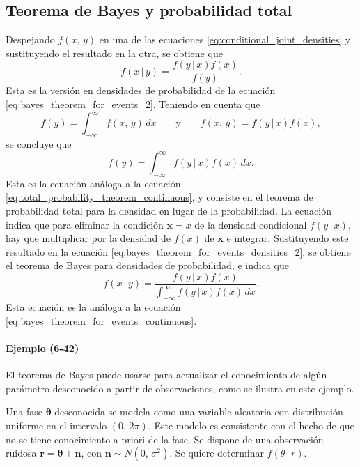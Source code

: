 \documentclass[a4paper]{report}
\newcommand{\x}{\mathbf{x}}
\begin{document}
\subsection{Teorema de Bayes y probabilidad total}

Despejando \(f(x,\,y)\) en una de las ecuaciones \ref{eq:conditional_joint_densities} y sustituyendo el resultado en la otra, se obtiene que
\begin{equation}\label{eq:bayes_theorem_for_events_densities_2}
 f(x\,|\,y)=\frac{f(y\,|\,x)f(x)}{f(y)}.
\end{equation}
Esta es la versión en densidades de probabilidad de la ecuación \ref{eq:bayes_theorem_for_events_2}. Teniendo en cuenta que
\[
 f(y)=\int_{-\infty}^{\infty}f(x,\,y)\,dx\qquad\textrm{y}\qquad f(x,\,y)=f(y\,|\,x)f(x),
\]
se concluye que
\[
 f(y)=\int_{-\infty}^{\infty}f(y\,|\,x)f(x)\,dx.
\]
Esta es la ecuación análoga a la ecuación \ref{eq:total_probability_theorem_continuous}, y consiste en el teorema de probabilidad total para la densidad en lugar de la probabilidad. La ecuación indica que para eliminar la condición \(\x=x\) de la densidad condicional \(f(y\,|\,x)\), hay que multiplicar por la densidad de \(f(x)\) de \(\x\) e integrar.
Sustituyendo este resultado en la ecuación \ref{eq:bayes_theorem_for_events_densities_2}, se obtiene el teorema de Bayes para densidades de probabilidad, e indica que
\begin{equation}\label{eq:bayes_theorem_for_events_densities_1}
 f(x\,|\,y)=\frac{f(y\,|\,x)f(x)}{\int_{-\infty}^{\infty}f(y\,|\,x)f(x)\,dx}.
\end{equation}
Esta ecuación es la análoga a la ecuación \ref{eq:bayes_theorem_for_events_continuous}.

\paragraph{Ejemplo (6-42)} El teorema de Bayes puede usarse para actualizar el conocimiento de algún parámetro desconocido a partir de observaciones, como se ilustra en este ejemplo.

Una fase \(\pmb{\theta}\) desconocida se modela como una variable aleatoria con distribución uniforme en el intervalo \((0,\,2\pi)\). Este modelo es consistente con el hecho de que no se tiene conocimiento a priori de la fase. Se dispone de una observación ruidosa \(\mathbf{r}=\pmb{\theta}+\mathbf{n}\), con \(\mathbf{n}\sim N(0,\,\sigma^2)\). Se quiere determinar \(f(\theta\,|\,r)\).
\end{document}
